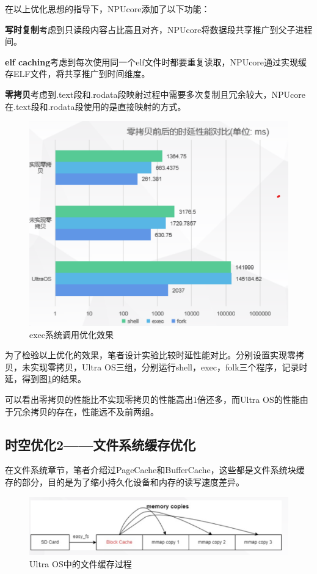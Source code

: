 在以上优化思想的指导下，NPUcore添加了以下功能：

\textbf{写时复制}\;考虑到只读段内容占比高且对齐，NPUcore将数据段共享推广到父子进程间。

\textbf{elf caching}\;考虑到每次使用同一个elf文件时都要重复读取，NPUcore通过实现缓存ELF文件，将共享推广到时间维度。

\textbf{零拷贝}\;考虑到.text段和.rodata段映射过程中需要多次复制且冗余较大，NPUcore在.text段和.rodata段使用的是直接映射的方式。

\begin{figure}[htbp]
	\centering
	\includegraphics[scale=0.75]{figures/10-04/10-04-04.png}
	\caption{exec系统调用优化效果}
	\label{exam-4}
\end{figure}

为了检验以上优化的效果，笔者设计实验比较时延性能对比。分别设置实现零拷贝，未实现零拷贝，Ultra OS三组，分别运行shell，exec，folk三个程序，记录时延，得到图\ref{exam-4}的结果。

可以看出零拷贝的性能比不实现零拷贝的性能高出1倍还多，而Ultra OS的性能由于冗余拷贝的存在，性能远不及前两组。

\subsection{时空优化2——文件系统缓存优化}

在文件系统章节，笔者介绍过PageCache和BufferCache，这些都是文件系统块缓存的部分，目的是为了缩小持久化设备和内存的读写速度差异。

\begin{figure}[htbp]
	\centering
	\includegraphics[scale=0.75]{figures/10-04/10-04-05.png}
	\caption{Ultra OS中的文件缓存过程}
	\label{exam-5}
\end{figure}

